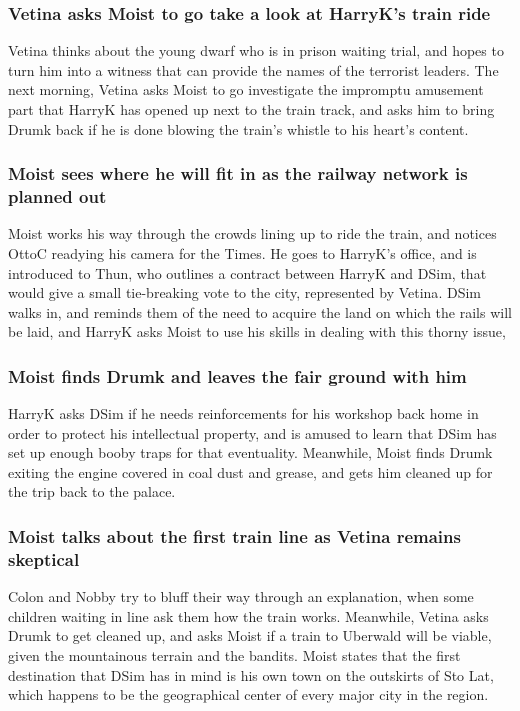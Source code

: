 \subsubsection{\Gls{Vetina} asks \Gls{Moist} to go take a look at \Gls{HarryK}'s train ride}
\Gls{Vetina} thinks about the young dwarf who is in prison waiting trial, and hopes to turn him
into a witness that can provide the names of the terrorist leaders. The next morning, \Gls{Vetina}
asks \Gls{Moist} to go investigate the impromptu amusement part that \Gls{HarryK} has opened up
next to the train track, and asks him to bring \Gls{Drumk} back if he is done blowing the train's
whistle to his heart's content.

\subsubsection{\Gls{Moist} sees where he will fit in as the railway network is planned out}
\Gls{Moist} works his way through the crowds lining up to ride the train, and notices \Gls{OttoC}
readying his camera for the Times. He goes to \Gls{HarryK}'s office, and is introduced to
\Gls{Thun}, who outlines a contract between \Gls{HarryK} and \Gls{DSim}, that would give a small
tie-breaking vote to the city, represented by \Gls{Vetina}. \Gls{DSim} walks in, and reminds them
of the need to acquire the land on which the rails will be laid, and \Gls{HarryK} asks \Gls{Moist}
to use his skills in dealing with this thorny issue,

\subsubsection{\Gls{Moist} finds \Gls{Drumk} and leaves the fair ground with him}
\Gls{HarryK} asks \Gls{DSim} if he needs reinforcements for his workshop back home in order to
protect his intellectual property, and is amused to learn that \Gls{DSim} has set up enough booby
traps for that eventuality. Meanwhile, \Gls{Moist} finds \Gls{Drumk} exiting the engine covered in
coal dust and grease, and gets him cleaned up for the trip back to the palace.

\subsubsection{\Gls{Moist} talks about the first train line as \Gls{Vetina} remains skeptical}
\Gls{Colon} and \Gls{Nobby} try to bluff their way through an explanation, when some children
waiting in line ask them how the train works. Meanwhile, \Gls{Vetina} asks \Gls{Drumk} to get
cleaned up, and asks \Gls{Moist} if a train to Uberwald will be viable, given the mountainous
terrain and the bandits. \Gls{Moist} states that the first destination that \Gls{DSim} has in mind
is his own town on the outskirts of Sto Lat, which happens to be the geographical center of every
major city in the region.

